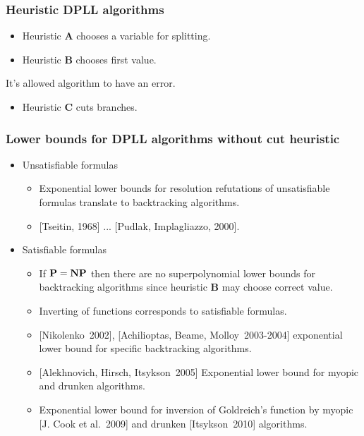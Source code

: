 \begin{frame}
	\frametitle{Heuristic DPLL algorithms}

   	
    
	\pause
    \pause
    \pause
    \pause
    \pause
    \begin{itemize}
        \item Heuristic $\mathbf{A}$ chooses a variable for splitting.
    	\pause
	    \item Heuristic $\mathbf{B}$ chooses first value.
    \end{itemize}

    \pause
    It's allowed algorithm to have an error.

    \pause
    \pause
    \begin{itemize}
	    \item Heuristic $\mathbf{C}$ cuts branches.
    \end{itemize}
\end{frame}

\begin{frame}
    \frametitle{Lower bounds for DPLL algorithms without cut heuristic}

    \pause
	\begin{itemize}
		\item Unsatisfiable formulas
		\begin{itemize}
            \item{} Exponential lower bounds for resolution refutations
				of unsatisfiable formulas translate to backtracking
                algorithms.
			\item{} [Tseitin, 1968] ... [Pudlak, Implagliazzo, 2000].
		\end{itemize}
        \pause
		\item Satisfiable formulas
		\begin{itemize}
			\item If $\bf P = NP$ then there are no superpolynomial
		        lower bounds for backtracking algorithms since
                heuristic $\mathbf{B}$ may choose correct value.
            \pause
			\item Inverting of functions corresponds to satisfiable
		        formulas.
            \pause
            \item{} [Nikolenko~2002], [Achilioptas, Beame, Molloy~2003-2004]
				exponential lower bound for specific backtracking
                algorithms.
            \item{} [Alekhnovich, Hirsch, Itsykson~2005] Exponential lower bound 
				for myopic and drunken algorithms.
            \pause
            \item{}  Exponential lower bound 
		for inversion of Goldreich's function by myopic [J. Cook et al.~2009] 
		and drunken [Itsykson~2010] algorithms.
		\end{itemize}
	\end{itemize}
\end{frame}


